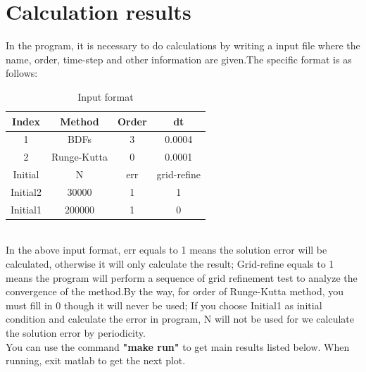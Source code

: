 \documentclass[a4paper,twocolumn]{article}
\theoremstyle{definition}
\begin{document}
\section{Calculation results}
In the program, it is necessary to do calculations by writing a input file where the name, order, time-step and other information are given.The specific format is as follows:
\begin{table}[!htp]
	\centering
	\begin{tabular}{|c|c|c|c|}
		\hline	
		Index & Method & Order & dt \\
		\hline		
		1 & BDFs & 3 & 0.0004   \\	
		\hline		
		2 & Runge-Kutta & 0 & 0.0001   \\	
		\hline \hline
		Initial & N & err & grid-refine\\
		\hline
		Initial2 & 30000 & 1 & 1 \\
		\hline
		Initial1 & 200000 & 1 & 0 \\
		\hline
	\end{tabular}
	\caption{Input format}
	\label{tab:format}
\end{table}\\
In the above input format, err equals to 1 means the solution error will be calculated, otherwise it will only calculate the result; Grid-refine equals to 1 means the program will perform a sequence of grid refinement test to analyze the convergence of the method.By the way, for order of Runge-Kutta method, you must fill in 0 though it will never be used; If you choose Initial1 as initial condition and calculate the error in program, N will not be used for we calculate the solution error by periodicity.\\
You can use the command \textbf{"make run"} to get main results listed below. When running, exit matlab to get the next plot.

\end{document}
